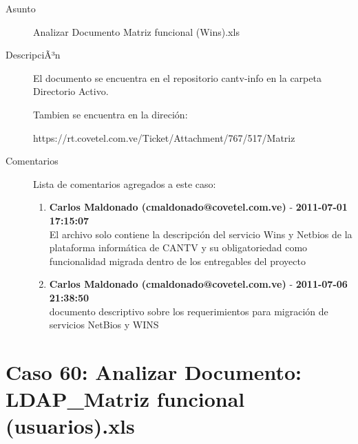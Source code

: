 \begin{description}

\item[Asunto] Analizar Documento Matriz funcional (Wins).xls \item[DescripciÃ³n] El documento se encuentra en el repositorio cantv-info en la carpeta Directorio
Activo.

Tambien se encuentra en la direción:

https://rt.covetel.com.ve/Ticket/Attachment/767/517/Matriz%

\item[Comentarios] Lista de comentarios agregados a este caso:  
\begin{enumerate}
        \item {\bfseries Carlos Maldonado (cmaldonado@covetel.com.ve)  } - {\bfseries 2011-07-01 17:15:07} \\ El archivo solo contiene la descripción del servicio Wins y Netbios de la plataforma informática de CANTV y su obligatoriedad como funcionalidad migrada dentro de los entregables del proyecto        \item {\bfseries Carlos Maldonado (cmaldonado@covetel.com.ve)  } - {\bfseries 2011-07-06 21:38:50} \\ documento descriptivo sobre los requerimientos para migración de servicios NetBios y WINS    \end{enumerate}

\end{description}

\section{Caso 60: Analizar Documento: LDAP_Matriz funcional (usuarios).xls }

